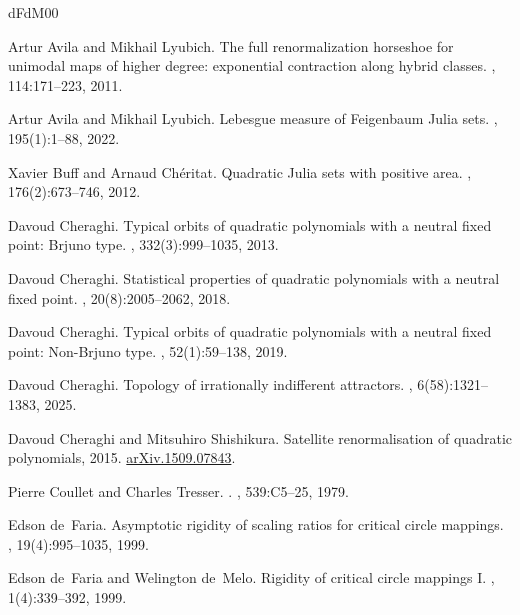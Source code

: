 \documentclass{amsart}
\begin{document}

 

\begin{thebibliography}{dFdM00}

Artur Avila and Mikhail Lyubich.
\newblock The full renormalization horseshoe for unimodal maps of higher degree: exponential contraction along hybrid classes.
, 114:171--223, 2011.

Artur Avila and Mikhail Lyubich.
\newblock Lebesgue measure of {Feigenbaum} {Julia} sets.
, 195(1):1--88, 2022.

Xavier Buff and Arnaud Ch\'eritat.
\newblock Quadratic {Julia} sets with positive area.
, 176(2):673--746, 2012.

Davoud Cheraghi.
\newblock Typical orbits of quadratic polynomials with a neutral fixed point: {Brjuno} type.
, 332(3):999--1035, 2013.

Davoud Cheraghi.
\newblock Statistical properties of quadratic polynomials with a neutral fixed point.
, 20(8):2005--2062, 2018.

Davoud Cheraghi.
\newblock Typical orbits of quadratic polynomials with a neutral fixed point: {Non-Brjuno} type.
, 52(1):59--138, 2019.

Davoud Cheraghi.
\newblock Topology of irrationally indifferent attractors.
, 6(58):1321--1383, 2025.

Davoud Cheraghi and Mitsuhiro Shishikura.
\newblock Satellite renormalisation of quadratic polynomials, 2015.
\newblock \href{https://arxiv.org/abs/1509.07843}{arXiv.1509.07843}.

Pierre Coullet and Charles Tresser.
.
, 539:C5--25, 1979.

Edson de~Faria.
\newblock Asymptotic rigidity of scaling ratios for critical circle mappings.
, 19(4):995--1035, 1999.

Edson de~Faria and Welington de~Melo.
\newblock Rigidity of critical circle mappings {I}.
, 1(4):339--392, 1999.


\end{thebibliography}
\end{document}
